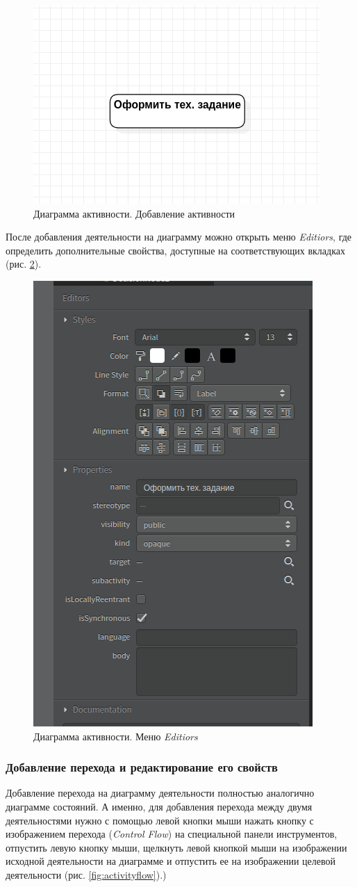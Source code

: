 \documentclass[a4paper,12pt]{report}
\begin{document}
\begin{figure}[h!]
	\centering
	\includegraphics[width=0.6\linewidth]{images/activityaction}
	\caption{Диаграмма активности. Добавление активности}
	\label{fig:activityaction}
\end{figure}


После добавления деятельности на диаграмму можно открыть меню \textit{Editiors}, где определить дополнительные свойства, доступные на соответствующих вкладках (рис. \ref{fig:activityeditors}).

\begin{figure}[h!]
	\centering
	\includegraphics[width=0.4\linewidth]{images/activityeditors}
	\caption{Диаграмма активности. Меню \textit{Editiors}}
	\label{fig:activityeditors}
\end{figure}

\subsubsection*{Добавление перехода и редактирование его свойств}

Добавление перехода на диаграмму деятельности полностью аналогично диаграмме состояний. А именно, для добавления перехода между двумя деятельностями нужно с помощью левой кнопки мыши нажать кнопку с изображением перехода (\textit{Control Flow}) на специальной панели инструментов, отпустить левую кнопку мыши, щелкнуть левой кнопкой мыши на изображении исходной деятельности на диаграмме и отпустить ее на изображении целевой деятельности (рис. \ref{fig:activityflow}).)
\end{document}
